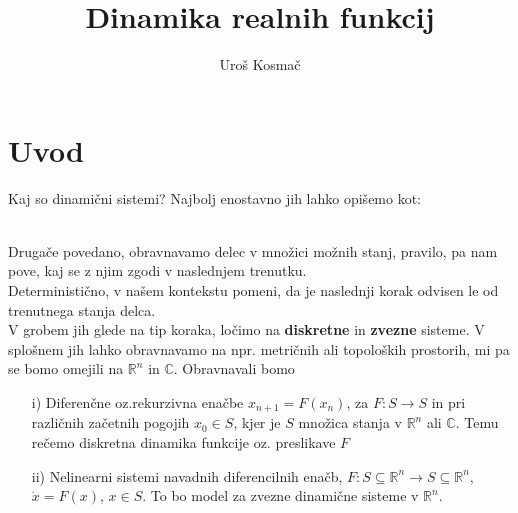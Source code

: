 \documentclass{article}
\title{Dinamika realnih funkcij}
\author{Uroš Kosmač}
\newcommand{\C}{\mathbb{C}}
\newcommand{\R}{\mathbb{R}}
\begin{document}
\section{Uvod}
Kaj so dinamični sistemi? Najbolj enostavno jih lahko opišemo kot:\\[1mm]
~\\[1mm]
Drugače povedano, obravnavamo delec v množici možnih stanj, pravilo, pa nam pove, kaj se z njim zgodi v naslednjem trenutku.\\ 
Deterministično, v našem kontekstu pomeni, da je naslednji korak odvisen le od trenutnega stanja delca.\\ 
V grobem jih glede na tip koraka, ločimo na \textbf{diskretne} in \textbf{zvezne} sisteme. V splošnem jih lahko obravnavamo na npr. metričnih ali topoloških prostorih, mi pa se bomo omejili na $\R^n$ in $\C$. Obravnavali bomo
\begin{enumerate}
\item[i)] Diferenčne oz.rekurzivna enačbe $x_{n+1} = F(x_n)$, 
za $F: S\rightarrow S$ in pri različnih začetnih pogojih $x_0 \in S$, kjer je $S$ množica stanja v $\R^n$ ali $\C$. Temu rečemo diskretna dinamika funkcije oz. preslikave $F$
\item[ii)] Nelinearni sistemi navadnih diferencilnih enačb, $F: S\subseteq \R^n \rightarrow S \subseteq \R^n$, $\dot{x} = F(x)$, $x\in S$. To bo model za zvezne dinamične sisteme v $\R^n$.
\end{enumerate}
\end{document}
